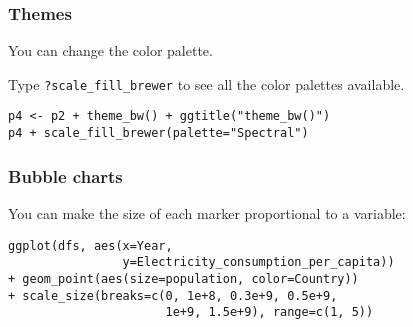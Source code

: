 \documentclass{beamer}
\begin{document}
	\begin{frame}[fragile]
		\frametitle{Themes}

		You can change the color palette.

		\vspace{2em}

		Type \verb|?scale_fill_brewer| to see all the color palettes available.

		\vspace{2em}

		\begin{exampleblock}{}
		\begin{BVerbatim}
p4 <- p2 + theme_bw() + ggtitle("theme_bw()")
p4 + scale_fill_brewer(palette="Spectral")
		\end{BVerbatim}
		\end{exampleblock}{}

	\end{frame}

	\begin{frame}[fragile]
		\frametitle{Bubble charts}

		You can make the size of each marker proportional to a variable:

		\vspace{2em}

		\begin{exampleblock}{}
		\begin{BVerbatim}
ggplot(dfs, aes(x=Year,
                y=Electricity_consumption_per_capita))
+ geom_point(aes(size=population, color=Country))
+ scale_size(breaks=c(0, 1e+8, 0.3e+9, 0.5e+9,
                      1e+9, 1.5e+9), range=c(1, 5))
		\end{BVerbatim}
		\end{exampleblock}{}

	\end{frame}
\end{document}
